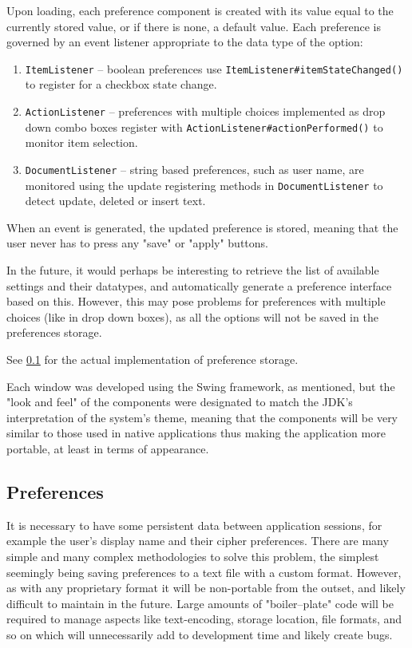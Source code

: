     Upon loading, each preference component is created with its value equal to the currently stored value, or if there is none, a default value. Each preference is governed by an event listener appropriate to the data type of the option:
    
    \begin{enumerate}
      \item \verb!ItemListener! -- boolean preferences use \verb!ItemListener#itemStateChanged()! to register for a checkbox state change.
      \item \verb!ActionListener! -- preferences with multiple choices implemented as drop down combo boxes register with \verb!ActionListener#actionPerformed()! to monitor item selection.
      \item \verb!DocumentListener! -- string based preferences, such as user name, are monitored using the update registering methods in \verb!DocumentListener! to detect update, deleted or insert text.
    \end{enumerate}
    
    When an event is generated, the updated preference is stored, meaning that the user never has to press any "save" or "apply" buttons.
    
    In the future, it would perhaps be interesting to retrieve the list of available settings and their datatypes, and automatically generate a preference interface based on this. However, this may pose problems for preferences with multiple choices (like in drop down boxes), as all the options will not be saved in the preferences storage.
    
    See \textsection\ref{subsec:prefs} for the actual implementation of preference storage.
    
    Each window was developed using the Swing framework, as mentioned, but the "look and feel" of the components were designated to match the JDK's interpretation of the system's theme, meaning that the components will be very similar to those used in native applications thus making the application more portable, at least in terms of appearance. 
    
  \subsection{Preferences}
  \label{subsec:prefs}
  
  It is necessary to have some persistent data between application sessions, for example the user's display name and their cipher preferences. There are many simple and many complex methodologies to solve this problem, the simplest seemingly being saving preferences to a text file with a custom format. However, as with any proprietary format it will be non-portable from the outset, and likely difficult to maintain in the future. Large amounts of "boiler--plate" code will be required to manage aspects like text-encoding, storage location, file formats, and so on which will unnecessarily add to development time and likely create bugs.
  
